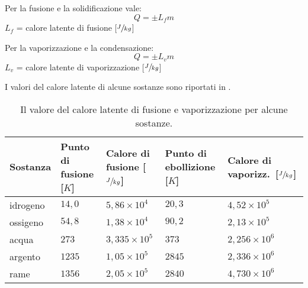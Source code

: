 \documentclass[a4paper,11pt,italian]{article}
\begin{document}
\begin{description}
  Per la fusione e la solidificazione vale:
  \[ Q = \pm L_f m \]
  $ L_f $ = calore latente di fusione [$ \sfrac{J}{kg} $]
  
  Per la vaporizzazione e la condensazione:
  \[ Q = \pm L_v m \]
  $ L_v $ = calore latente di vaporizzazione [$ \sfrac{J}{kg} $]

  I valori del calore latente di alcune sostanze sono riportati in .

  \begin{table}[htb]\centering\footnotesize
    \begin{tabular}{lllll}\toprule
    \textbf{Sostanza} & \textbf{Punto di fusione [$K$]} & \textbf{Calore di fusione [$\sfrac{J}{kg}$]} & \textbf{Punto di ebollizione [$K$]} & \textbf{Calore di vaporizz.~[$\sfrac{J}{kg}$]} \\\midrule
    idrogeno  & $ 14,0 $ & $ 5,86 \times 10^4 $  & $ 20,3 $ & $ 4,52 \times 10^5 $\\\addlinespace[1em]
    ossigeno  & $ 54,8 $ & $ 1,38 \times 10^4 $  & $ 90,2 $ & $ 2,13  \times 10^5 $\\\addlinespace[1em]
    acqua     & $ 273  $ & $ 3,335 \times 10^5 $ & $ 373 $  & $ 2,256  \times 10^6 $\\\addlinespace[1em]
    argento   & $ 1235 $ & $ 1,05 \times 10^5 $  & $ 2845 $ & $ 2,336  \times 10^6 $\\\addlinespace[1em]
    rame      & $ 1356 $ & $ 2,05 \times 10^5 $  & $ 2840 $ & $ 4,730  \times 10^6 $\\\bottomrule
    \end{tabular}
    \caption{Il valore del calore latente di fusione e vaporizzazione per alcune sostanze.}
    \label{tab:calorilatenti}
    \end{table}
\end{description}
\end{document}
